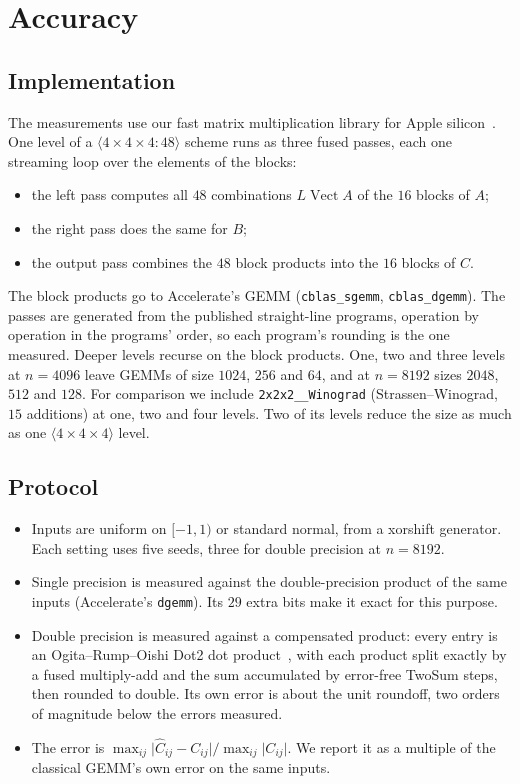 \documentclass[11pt]{article}
\theoremstyle{remark}
\newcommand{\vect}{\operatorname{Vect}}
\newcommand{\mm}[1]{\langle #1\rangle}
\begin{document}
\section{Accuracy}\label{sec:acc}

\subsection{Implementation}

The measurements use our fast matrix multiplication library for Apple
silicon~\cite{logic}.  One level of a $\mm{4\times4\times4:48}$ scheme
runs as three fused passes, each one streaming loop over the elements of
the blocks:
\begin{itemize}
\item the left pass computes all $48$ combinations $L\vect A$ of the $16$
  blocks of $A$;
\item the right pass does the same for $B$;
\item the output pass combines the $48$ block products into the $16$
  blocks of $C$.
\end{itemize}
The block products go to Accelerate's GEMM (\texttt{cblas\_sgemm},
\texttt{cblas\_dgemm}).  The passes are generated from the published
straight-line programs, operation by operation in the programs' order,
so each program's rounding is the one measured.  Deeper levels recurse
on the block products.  One, two and three levels at $n=4096$ leave
GEMMs of size $1024$, $256$ and $64$, and at $n=8192$ sizes $2048$, $512$
and $128$.  For comparison we include
\texttt{2x2x2\_\_\allowbreak Winograd} (Strassen--Winograd, $15$ additions) at one, two
and four levels.  Two of its levels reduce the size as much as one
$\mm{4\times4\times4}$ level.

\subsection{Protocol}\label{sec:protocol}

\begin{itemize}
\item Inputs are uniform on $[-1,1)$ or standard normal, from a xorshift
  generator.  Each setting uses five seeds, three for double precision at
  $n=8192$.
\item Single precision is measured against the double-precision product
  of the same inputs (Accelerate's \texttt{dgemm}).  Its $29$ extra bits
  make it exact for this purpose.
\item Double precision is measured against a compensated product: every
  entry is an Ogita--Rump--Oishi Dot2 dot product~\cite{ORO05}, with
  each product split exactly by a fused multiply-add and the sum
  accumulated by error-free TwoSum steps, then rounded to double.  Its
  own error is about the unit roundoff, two orders of magnitude below
  the errors measured.
\item The error is $\max_{ij}\lvert\hat C_{ij}-C_{ij}\rvert/\max_{ij}\lvert
  C_{ij}\rvert$.  We report it as a multiple of the classical GEMM's own
  error on the same inputs.
\end{itemize}
\end{document}
